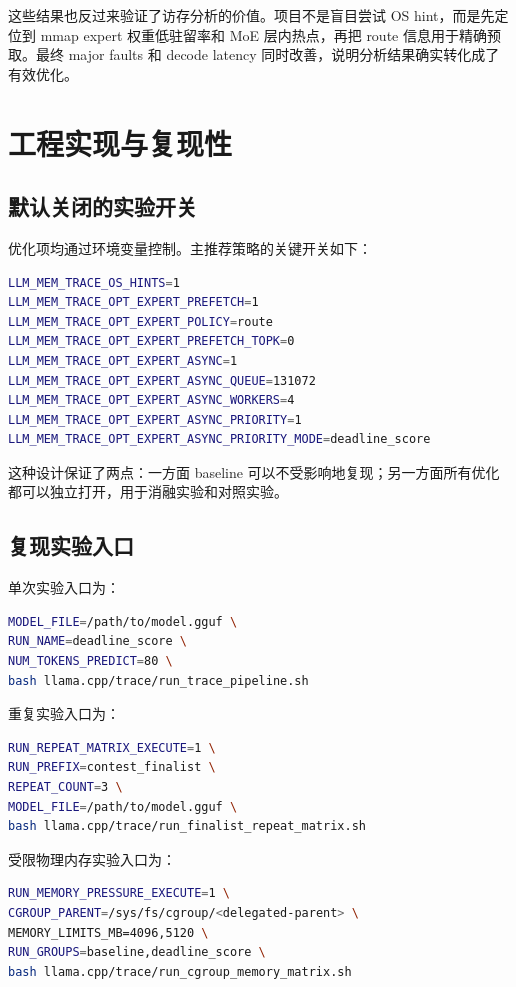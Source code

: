\documentclass[a4paper]{article}
\begin{document}
这些结果也反过来验证了访存分析的价值。项目不是盲目尝试 OS hint，而是先定位到 mmap expert 权重低驻留率和 MoE 层内热点，再把 route 信息用于精确预取。最终 major faults 和 decode latency 同时改善，说明分析结果确实转化成了有效优化。

\section{工程实现与复现性}

\subsection{默认关闭的实验开关}

优化项均通过环境变量控制。主推荐策略的关键开关如下：

\begin{lstlisting}[language=bash]
LLM_MEM_TRACE_OS_HINTS=1
LLM_MEM_TRACE_OPT_EXPERT_PREFETCH=1
LLM_MEM_TRACE_OPT_EXPERT_POLICY=route
LLM_MEM_TRACE_OPT_EXPERT_PREFETCH_TOPK=0
LLM_MEM_TRACE_OPT_EXPERT_ASYNC=1
LLM_MEM_TRACE_OPT_EXPERT_ASYNC_QUEUE=131072
LLM_MEM_TRACE_OPT_EXPERT_ASYNC_WORKERS=4
LLM_MEM_TRACE_OPT_EXPERT_ASYNC_PRIORITY=1
LLM_MEM_TRACE_OPT_EXPERT_ASYNC_PRIORITY_MODE=deadline_score
\end{lstlisting}

这种设计保证了两点：一方面 baseline 可以不受影响地复现；另一方面所有优化都可以独立打开，用于消融实验和对照实验。

\subsection{复现实验入口}

单次实验入口为：

\begin{lstlisting}[language=bash]
MODEL_FILE=/path/to/model.gguf \
RUN_NAME=deadline_score \
NUM_TOKENS_PREDICT=80 \
bash llama.cpp/trace/run_trace_pipeline.sh
\end{lstlisting}

重复实验入口为：

\begin{lstlisting}[language=bash]
RUN_REPEAT_MATRIX_EXECUTE=1 \
RUN_PREFIX=contest_finalist \
REPEAT_COUNT=3 \
MODEL_FILE=/path/to/model.gguf \
bash llama.cpp/trace/run_finalist_repeat_matrix.sh
\end{lstlisting}

受限物理内存实验入口为：

\begin{lstlisting}[language=bash]
RUN_MEMORY_PRESSURE_EXECUTE=1 \
CGROUP_PARENT=/sys/fs/cgroup/<delegated-parent> \
MEMORY_LIMITS_MB=4096,5120 \
RUN_GROUPS=baseline,deadline_score \
bash llama.cpp/trace/run_cgroup_memory_matrix.sh
\end{lstlisting}
\end{document}
